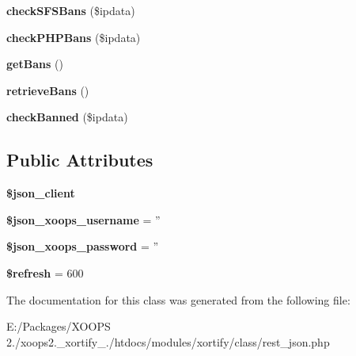 \begin{DoxyCompactItemize}
\item 
\hypertarget{class_r_e_s_t___j_s_o_n_xortify_exchange_a332c2ae4230528a4a84a82e445e8676d}{{\bfseries check\-S\-F\-S\-Bans} (\$ipdata)}\label{class_r_e_s_t___j_s_o_n_xortify_exchange_a332c2ae4230528a4a84a82e445e8676d}

\item 
\hypertarget{class_r_e_s_t___j_s_o_n_xortify_exchange_a29bbf0bc907df90d603680e11c5c564a}{{\bfseries check\-P\-H\-P\-Bans} (\$ipdata)}\label{class_r_e_s_t___j_s_o_n_xortify_exchange_a29bbf0bc907df90d603680e11c5c564a}

\item 
\hypertarget{class_r_e_s_t___j_s_o_n_xortify_exchange_ac5cc8b57fe546a79d4d5591efb554809}{{\bfseries get\-Bans} ()}\label{class_r_e_s_t___j_s_o_n_xortify_exchange_ac5cc8b57fe546a79d4d5591efb554809}

\item 
\hypertarget{class_r_e_s_t___j_s_o_n_xortify_exchange_a836efe279696510e1adfbf1c6e7f3286}{{\bfseries retrieve\-Bans} ()}\label{class_r_e_s_t___j_s_o_n_xortify_exchange_a836efe279696510e1adfbf1c6e7f3286}

\item 
\hypertarget{class_r_e_s_t___j_s_o_n_xortify_exchange_a931c5d5f90b20f7ecb66b34076886edc}{{\bfseries check\-Banned} (\$ipdata)}\label{class_r_e_s_t___j_s_o_n_xortify_exchange_a931c5d5f90b20f7ecb66b34076886edc}

\end{DoxyCompactItemize}
\subsection*{Public Attributes}
\begin{DoxyCompactItemize}
\item 
\hypertarget{class_r_e_s_t___j_s_o_n_xortify_exchange_adcea2c0ce5c81dc38cb1b52e40918717}{{\bfseries \$json\-\_\-client}}\label{class_r_e_s_t___j_s_o_n_xortify_exchange_adcea2c0ce5c81dc38cb1b52e40918717}

\item 
\hypertarget{class_r_e_s_t___j_s_o_n_xortify_exchange_aeffd57ee317ac7eb898050a477bdd4da}{{\bfseries \$json\-\_\-xoops\-\_\-username} = ''}\label{class_r_e_s_t___j_s_o_n_xortify_exchange_aeffd57ee317ac7eb898050a477bdd4da}

\item 
\hypertarget{class_r_e_s_t___j_s_o_n_xortify_exchange_ae33e984ae0fe2c5af273f943aa822ea5}{{\bfseries \$json\-\_\-xoops\-\_\-password} = ''}\label{class_r_e_s_t___j_s_o_n_xortify_exchange_ae33e984ae0fe2c5af273f943aa822ea5}

\item 
\hypertarget{class_r_e_s_t___j_s_o_n_xortify_exchange_abb0badd6352c3c81fee3f62ad1b992e7}{{\bfseries \$refresh} = 600}\label{class_r_e_s_t___j_s_o_n_xortify_exchange_abb0badd6352c3c81fee3f62ad1b992e7}

\end{DoxyCompactItemize}


The documentation for this class was generated from the following file\-:\begin{DoxyCompactItemize}
\item 
E\-:/\-Packages/\-X\-O\-O\-P\-S 2./xoops2.\-\_\-xortify\-\_./htdocs/modules/xortify/class/rest\-\_\-json.\-php\end{DoxyCompactItemize}
